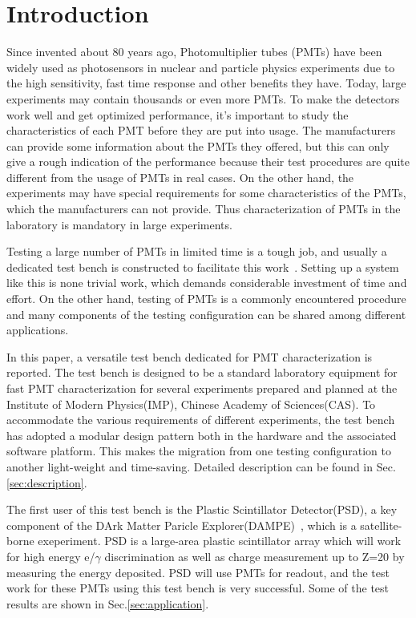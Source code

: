 \documentclass[5p, times]{elsarticle}
\begin{document}
\section{Introduction}
\label{sec:introduction}

Since invented about 80 years ago, Photomultiplier tubes (PMTs) have been widely used as photosensors in nuclear and particle physics experiments due to the high sensitivity, fast time response and other benefits they have. Today, large experiments may contain thousands or even more PMTs. To make the detectors work well and get optimized performance, it's important to study the characteristics of each PMT before they are put into usage. 
The manufacturers can provide some information about the PMTs they offered, but this can only give a rough indication of the performance because their test procedures are quite different from the usage of PMTs in real cases. On the other hand, the experiments may have special requirements for some characteristics of the PMTs, which the manufacturers can not provide. 
Thus characterization of PMTs in the laboratory is mandatory in large experiments.

Testing a large number of PMTs in limited time is a tough job, and usually a dedicated test bench is constructed to facilitate this work~\cite{barnhill_testing_2008,akgun_complete_2005,adragna_pmt-block_2006}.
Setting up a system like this is none trivial work, which demands considerable investment of time and effort.
On the other hand, testing of PMTs is a commonly encountered procedure and many components of the testing configuration can be shared among different applications.

In this paper, a versatile test bench dedicated for PMT characterization is reported.
The test bench is designed to be a standard laboratory equipment for fast PMT characterization for several experiments prepared and planned at the Institute of Modern Physics(IMP), Chinese Academy of Sciences(CAS).
To accommodate the various requirements of different experiments, the test bench has adopted a modular design pattern both in the hardware and the associated software platform.
This makes the migration from one testing configuration to another light-weight and time-saving.
Detailed description can be found in Sec.\ref{sec:description}.

The first user of this test bench is the Plastic Scintillator Detector(PSD), a key component of the DArk Matter Paricle Explorer(DAMPE)~\cite{Chang_Jin_dampe}, which is a satellite-borne exeperiment. 
PSD is a large-area plastic scintillator array which will work for high energy e/$\gamma$ discrimination as well as charge measurement up to Z=20 by measuring the energy deposited.
PSD will use PMTs for readout, and the test work for these PMTs using this test bench is very successful. Some of the test results are shown in Sec.\ref{sec:application}.
\end{document}
